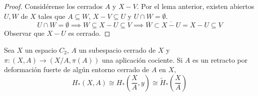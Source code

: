 \begin{proof}
Considérense los cerrados $A$ y $X-V$. Por el lema anterior, existen abiertos $U,W$ de $X$ tales que $A \subseteq W$, $X-V \subseteq U$ y $U\cap W=\emptyset$. $$U\cap W =\emptyset \implies W \subseteq X-U \subseteq V \implies \overline{W} \subset \overline{X-U}=X-U \subseteq V$$ Observar que $X-U$ es cerrado.\end{proof}

\begin{teo}
Sea $X$ un espacio $C_2$, $A$ un subespacio cerrado de $X$ y $\pi: (X,A) \longrightarrow (X/A,\pi(A))$ una aplicación cociente. Si $A$ es un retracto por deformación fuerte de algún entorno cerrado de $A$ en $X$, $$H_*(X,A) \cong H_*\left(\frac{X}{A},y\right) \cong \tilde{H}_*\left(\frac{X}{A}\right)$$
\end{teo}

